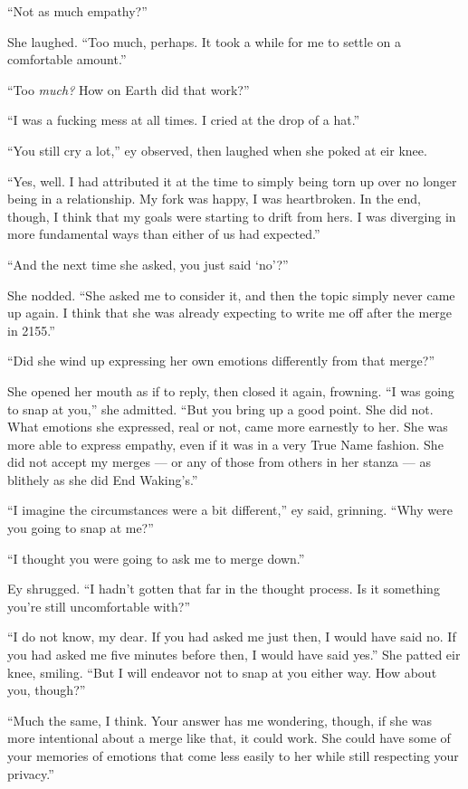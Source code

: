 ``Not as much empathy?''

She laughed. ``Too much, perhaps. It took a while for me to settle on a comfortable amount.''

``Too \emph{much?} How on Earth did that work?''

``I was a fucking mess at all times. I cried at the drop of a hat.''

``You still cry a lot,'' ey observed, then laughed when she poked at eir knee.

``Yes, well. I had attributed it at the time to simply being torn up over no longer being in a relationship. My fork was happy, I was heartbroken. In the end, though, I think that my goals were starting to drift from hers. I was diverging in more fundamental ways than either of us had expected.''

``And the next time she asked, you just said `no'?''

She nodded. ``She asked me to consider it, and then the topic simply never came up again. I think that she was already expecting to write me off after the merge in 2155.''

``Did she wind up expressing her own emotions differently from that merge?''

She opened her mouth as if to reply, then closed it again, frowning. ``I was going to snap at you,'' she admitted. ``But you bring up a good point. She did not. What emotions she expressed, real or not, came more earnestly to her. She was more able to express empathy, even if it was in a very True Name fashion. She did not accept my merges — or any of those from others in her stanza — as blithely as she did End Waking's.''

``I imagine the circumstances were a bit different,'' ey said, grinning. ``Why were you going to snap at me?''

``I thought you were going to ask me to merge down.''

Ey shrugged. ``I hadn't gotten that far in the thought process. Is it something you're still uncomfortable with?''

``I do not know, my dear. If you had asked me just then, I would have said no. If you had asked me five minutes before then, I would have said yes.'' She patted eir knee, smiling. ``But I will endeavor not to snap at you either way. How about you, though?''

``Much the same, I think. Your answer has me wondering, though, if she was more intentional about a merge like that, it could work. She could have some of your memories of emotions that come less easily to her while still respecting your privacy.''

